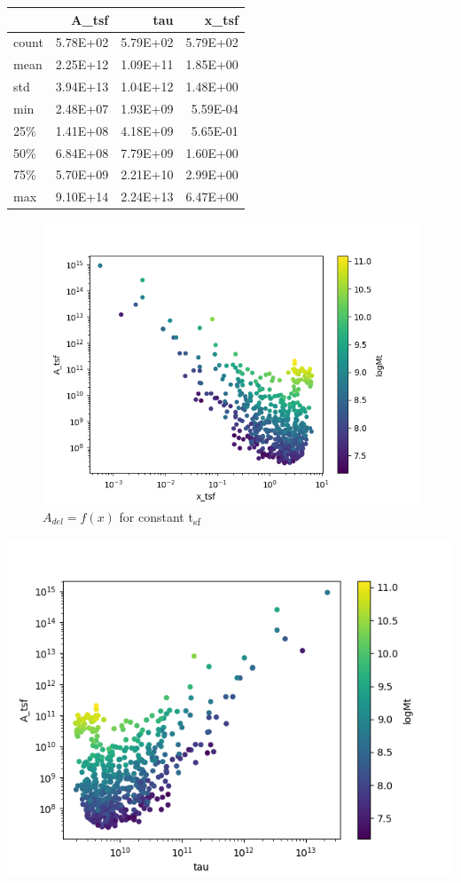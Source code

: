 \documentclass[a4paper,twocolumn]{article}
\begin{document}
\begin{table}[hc]
\centering
\begin{tabular}{lrrr}
\toprule
{} &    A\_tsf &      tau &    x\_tsf \\
\midrule
count & 5.78E+02 & 5.79E+02 & 5.79E+02 \\
mean  & 2.25E+12 & 1.09E+11 & 1.85E+00 \\
std   & 3.94E+13 & 1.04E+12 & 1.48E+00 \\
min   & 2.48E+07 & 1.93E+09 & 5.59E-04 \\
25\%   & 1.41E+08 & 4.18E+09 & 5.65E-01 \\
50\%   & 6.84E+08 & 7.79E+09 & 1.60E+00 \\
75\%   & 5.70E+09 & 2.21E+10 & 2.99E+00 \\
max   & 9.10E+14 & 2.24E+13 & 6.47E+00 \\
\bottomrule
\end{tabular}
\end{table}

\begin{figure}[htbp]
\centering
\includegraphics[width=.9\linewidth]{./figs/x-A_tsf.png}
\caption{\label{fig:$A_{del} = f(x)$ for constant t_{sf}}\(A_{del} = f(x)\) for constant t\textsubscript{sf}}
\end{figure}

\begin{center}
\includegraphics[width=.9\linewidth]{figs/T-A_tsf.png}
\end{center}
\end{document}
